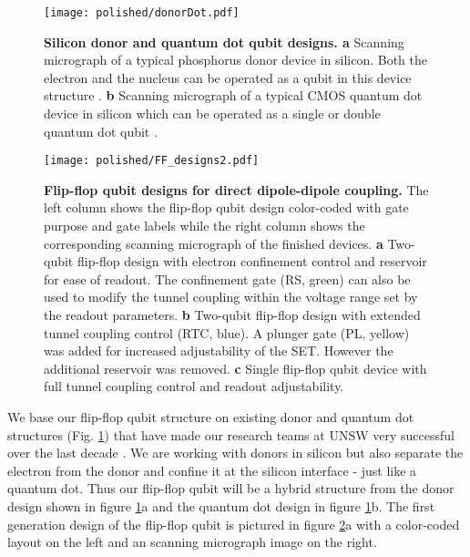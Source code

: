 \begin{figure}
	\centering
	\texttt{[image: polished/donorDot.pdf]}
	\caption[Silicon donor and quantum dot qubit designs]{\textbf{Silicon donor and quantum dot qubit designs. a} Scanning micrograph of a typical phosphorus donor device in silicon. Both the electron and the nucleus can be operated as a qubit in this device structure \cite{Muhonen2014}. \textbf{b} Scanning micrograph of a typical CMOS quantum dot device in silicon which can be operated as a single or double quantum dot qubit \cite{Veldhorst2014}.}
	\label{fig:donorDotDevices}
\end{figure}

\begin{figure}
	\centering
	\texttt{[image: polished/FF\_designs2.pdf]}
	\caption[Flip-flop qubit designs for direct dipole-dipole coupling]{\textbf{Flip-flop qubit designs for direct dipole-dipole coupling. } The left column shows the flip-flop qubit design color-coded with gate purpose and gate labels while the right column shows the corresponding scanning micrograph of the finished devices. \textbf{a} Two-qubit flip-flop design with electron confinement control and reservoir for ease of readout. The confinement gate (RS, green) can also be used to modify the tunnel coupling within the voltage range set by the readout parameters. \textbf{b} Two-qubit flip-flop design with extended tunnel coupling control (RTC, blue). A plunger gate (PL, yellow) was added for increased adjustability of the SET. However the additional reservoir was removed. \textbf{c} Single flip-flop qubit device with full tunnel coupling control and readout adjustability.}
	\label{fig:designFF}
\end{figure}

We base our flip-flop qubit structure on existing donor and quantum dot structures (Fig.  \ref{fig:donorDotDevices}) that have made our research teams at UNSW very successful over the last decade \cite{Muhonen2014, Veldhorst2014}. We are working with donors in silicon but also separate the electron from the donor and confine it at the silicon interface - just like a quantum dot. Thus our flip-flop qubit will be a hybrid structure from the donor design shown in figure \ref{fig:donorDotDevices}a and the quantum dot design in figure \ref{fig:donorDotDevices}b. The first generation design of the flip-flop qubit is pictured in figure \ref{fig:designFF}a with a color-coded  layout on the left and an scanning micrograph image on the right. 

